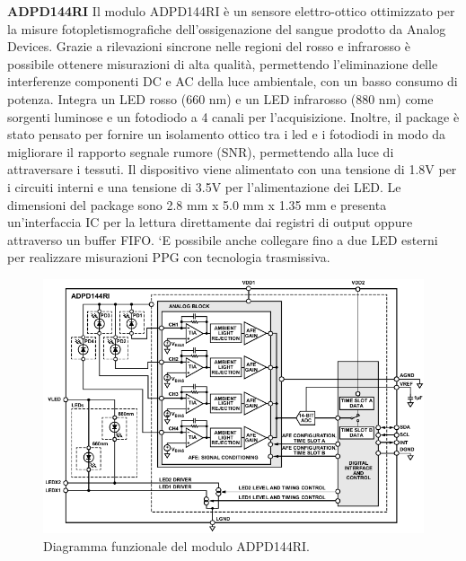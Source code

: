 \textbf{ADPD144RI} Il modulo ADPD144RI è un sensore elettro-ottico ottimizzato per la misure fotopletismografiche dell'ossigenazione del sangue prodotto da Analog Devices\cite{AnalogDevicesADPD144RI}. Grazie a rilevazioni sincrone nelle regioni del rosso e infrarosso è possibile ottenere misurazioni di alta qualità, permettendo l'eliminazione delle interferenze componenti DC e AC della luce ambientale, con un basso consumo di potenza. Integra un LED rosso (660 nm) e un LED infrarosso (880 nm) come sorgenti luminose e un fotodiodo a 4 canali per l'acquisizione. Inoltre, il package è stato pensato per fornire un isolamento ottico tra i led e i fotodiodi in modo da migliorare il rapporto segnale rumore (SNR), permettendo alla luce di attraversare i tessuti. Il dispositivo viene alimentato con una tensione di 1.8V per i circuiti interni e una tensione di 3.5V per l'alimentazione dei LED. Le dimensioni del package sono 2.8 mm x 5.0 mm x 1.35 mm e presenta un'interfaccia IC per la lettura direttamente dai registri di output oppure attraverso un buffer FIFO. `E possibile anche collegare fino a due LED esterni per realizzare misurazioni PPG con tecnologia trasmissiva.
\begin{figure}[h]
	\centering
	\includegraphics[width=0.9\linewidth]{ImageFiles/Fotopletismografia/ADPD144RIBlockDiagram}
	\caption{Diagramma funzionale del modulo ADPD144RI.}
	\label{fig:ADPD144RIBlockDiagram}
\end{figure}

